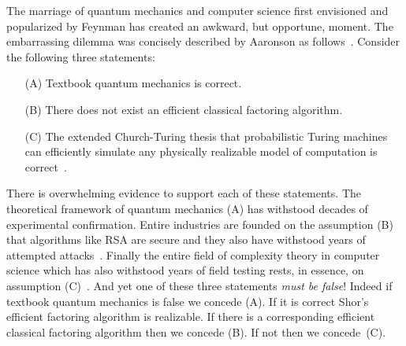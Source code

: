 \documentclass{article}
\theoremstyle{remark}
\begin{document}
The marriage of quantum mechanics and computer science first
envisioned and popularized by Feynman has created an awkward, but
opportune, moment. The embarrassing dilemma was concisely described by
Aaronson as follows~\cite{AaronsonArkhipov2011,BFRDARW2013}. 
Consider the following three statements:
\begin{enumerate}
\item[(A)] Textbook quantum mechanics is correct.
\item[(B)] There does not exist an efficient classical factoring
  algorithm.
\item[(C)] The extended Church-Turing thesis that probabilistic Turing
  machines can efficiently simulate any physically realizable model of
  computation is correct~\cite{BernsteinVazirani1997,Kaye2007}.
\end{enumerate}
There is overwhelming evidence to support each of these
statements. The theoretical framework of quantum mechanics (A) has
withstood decades of experimental confirmation. Entire industries are
founded on the assumption (B) that algorithms like RSA are secure and
they also have withstood years of attempted
attacks~\cite{boneh1999twenty,wiki:RSAFactoring}. Finally the
entire field of complexity theory in computer science which has also
withstood years of field testing rests, in essence, on assumption
(C)~\cite{Aaronson2005,Piccinini2015}. 
And yet one of these three statements \emph{must be false}! Indeed
if textbook quantum mechanics is false we concede (A). If it is
correct Shor's efficient factoring algorithm is realizable. If there
is a corresponding efficient classical factoring algorithm then we
concede (B). If not then we concede~(C).
\end{document}
